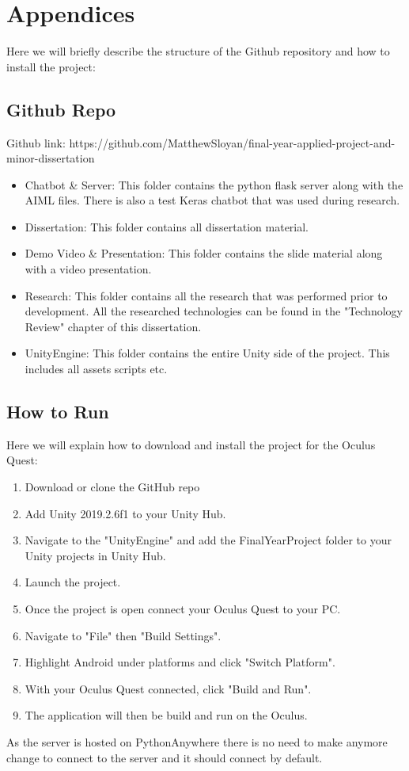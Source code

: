 \chapter{Appendices}

Here we will briefly describe the structure of the Github repository and how to install the project:

\section{Github Repo}
Github link: https://github.com/MatthewSloyan/final-year-applied-project-and-minor-dissertation
\begin{itemize}
    \item Chatbot \& Server: This folder contains the python flask server along with the AIML files. There is also a test Keras chatbot that was used during research.
    \item Dissertation: This folder contains all dissertation material.
    \item Demo Video \& Presentation: This folder contains the slide material along with a video presentation.
    \item Research: This folder contains all the research that was performed prior to development. All the researched technologies can be found in the "Technology Review" chapter of this dissertation. 
    \item UnityEngine: This folder contains the entire Unity side of the project. This includes all assets scripts etc.
\end{itemize}
\newpage
\section{How to Run}
Here we will explain how to download and install the project for the Oculus Quest:
\begin{enumerate}
    \item Download or clone the GitHub repo
    \item Add Unity 2019.2.6f1 to your Unity Hub. 
    \item Navigate to the "UnityEngine" and add the FinalYearProject folder to your Unity projects in Unity Hub.
    \item Launch the project.
    \item Once the project is open connect your Oculus Quest to your PC.
    \item Navigate to "File" then "Build Settings".
    \item Highlight Android under platforms and click "Switch Platform".
    \item With your Oculus Quest connected, click "Build and Run".
    \item The application will then be build and run on the Oculus.
\end{enumerate}

As the server is hosted on PythonAnywhere there is no need to make anymore change to connect to the server and it should connect by default.